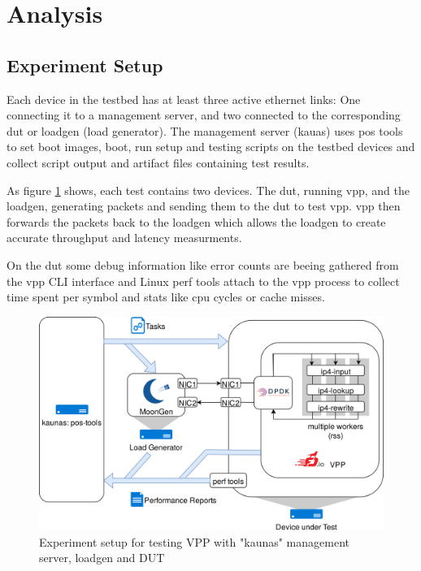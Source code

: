
\section{Analysis}


\subsection{Experiment Setup}

Each device in the testbed has at least three active ethernet links:
One connecting it to a management server, and two connected to the
corresponding \Ac{dut} or loadgen (load generator). The management
server (kauas) uses pos tools to set boot images, boot, run setup and
testing scripts on the testbed devices and collect script output and
artifact files containing test results.

As figure \ref{setup} shows, each test contains two
devices. The \Ac{dut}, running \Ac{vpp}, and the loadgen, generating
packets and sending them to the \Ac{dut} to test \Ac{vpp}. \Ac{vpp}
then forwards the packets back to the loadgen which allows the loadgen
to create accurate throughput and latency measurments.

On the \Ac{dut} some debug information like error counts are beeing
gathered from the \Ac{vpp} CLI interface and Linux perf tools
\cite{perf} attach to the vpp process to collect time spent per symbol
and stats like cpu cycles or cache misses.

\begin{figure}[!ht]
\noindent\hspace{0.5mm}\includegraphics[width=\linewidth]{pics/topology.png}
\caption{Experiment setup for testing VPP with "kaunas" management server, loadgen and DUT}
\label{setup}
\end{figure}

